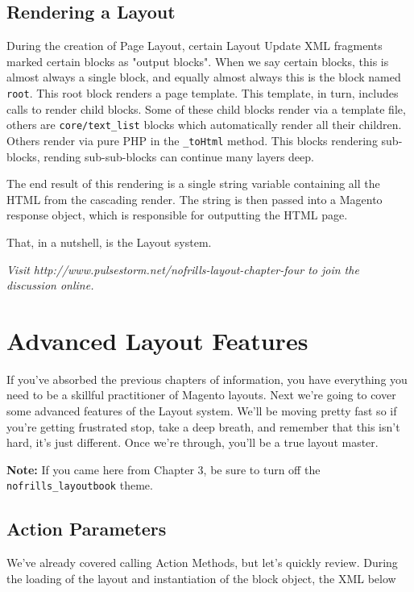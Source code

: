 \documentclass[oneside]{book}
\begin{document}
\section{Rendering a Layout}

During the creation of Page Layout, certain Layout Update XML fragments marked certain blocks as "output blocks".  When we say certain blocks, this is almost always a single block, and equally almost always this is the block named \footnotesize\texttt{root}\normalsize.  This root block renders a page template.  This template, in turn, includes calls to render child blocks.  Some of these child blocks render via a template file, others are \footnotesize\texttt{core/text\_list} \normalsize  blocks which automatically render all their children.  Others render via pure PHP in the \footnotesize\texttt{\_toHtml} \normalsize  method.  This blocks rendering sub-blocks, rending sub-sub-blocks can continue many layers deep.

The end result of this  rendering is a single string variable containing all the HTML from the cascading render.  The string is then passed into a Magento response object, which is responsible for outputting the HTML page.

That, in a nutshell, is the Layout system.

\emph{Visit http://www.pulsestorm.net/nofrills-layout-chapter-four to join the discussion online.}
\chapter{Advanced Layout Features}
If you've absorbed the previous chapters of information, you have everything you need to be a skillful practitioner of Magento layouts.  Next we're going to cover some advanced features of the Layout system.  We'll be moving pretty fast so if you're getting frustrated stop, take a deep breath, and remember that this isn't hard, it's just different.  Once we're through, you'll be a true layout master.

\textbf{Note:} If you came here from Chapter 3, be sure to turn off the \footnotesize\texttt{nofrills\_layoutbook} \normalsize  theme.

\section{Action Parameters}

We've already covered calling Action Methods, but let's quickly review. During the loading of the layout and instantiation of the block object, the XML below
\end{document}
